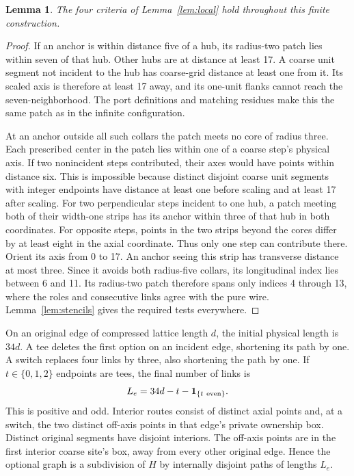 \documentclass[11pt]{article}
\newtheorem{lemma}[theorem]{Lemma}
\newcommand{\ind}{\mathbf{1}}
\begin{document}
\begin{lemma}\label{lem:glue}
The four criteria of Lemma~\ref{lem:local} hold throughout this finite construction.
\end{lemma}
\begin{proof}
If an anchor is within distance five of a hub, its radius-two patch lies within seven of that hub. Other hubs are at distance at least 17. A coarse unit segment not incident to the hub has coarse-grid distance at least one from it. Its scaled axis is therefore at least 17 away, and its one-unit flanks cannot reach the seven-neighborhood. The port definitions and matching residues make this the same patch as in the infinite configuration.

At an anchor outside all such collars the patch meets no core of radius three. Each prescribed center in the patch lies within one of a coarse step's physical axis. If two nonincident steps contributed, their axes would have points within distance six. This is impossible because distinct disjoint coarse unit segments with integer endpoints have distance at least one before scaling and at least 17 after scaling. For two perpendicular steps incident to one hub, a patch meeting both of their width-one strips has its anchor within three of that hub in both coordinates. For opposite steps, points in the two strips beyond the cores differ by at least eight in the axial coordinate. Thus only one step can contribute there. Orient its axis from 0 to 17. An anchor seeing this strip has transverse distance at most three. Since it avoids both radius-five collars, its longitudinal index lies between 6 and 11. Its radius-two patch therefore spans only indices 4 through 13, where the roles and consecutive links agree with the pure wire. Lemma~\ref{lem:stencils} gives the required tests everywhere.
\end{proof}

On an original edge of compressed lattice length \(d\), the initial physical length is \(34d\). A tee deletes the first option on an incident edge, shortening its path by one. A switch replaces four links by three, also shortening the path by one. If \(t\in\{0,1,2\}\) endpoints are tees, the final number of links is
\[
  L_e=34d-t-\ind_{\{t\ {\rm even}\}}.
\]
This is positive and odd. Interior routes consist of distinct axial points and, at a switch, the two distinct off-axis points in that edge's private ownership box. Distinct original segments have disjoint interiors. The off-axis points are in the first interior coarse site's box, away from every other original edge. Hence the optional graph is a subdivision of \(H\) by internally disjoint paths of lengths \(L_e\).
\end{document}

